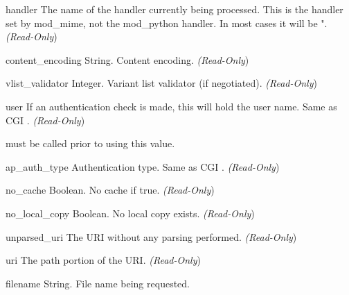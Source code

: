 \begin{memberdesc}[request]{handler}
  The name of the handler currently being processed. This is the handler
  set by mod_mime, not the mod_python handler. In most cases it will be
  ". \emph{(Read-Only})
\end{memberdesc}

\begin{memberdesc}[request]{content_encoding}
  String. Content encoding.
  \emph{(Read-Only})
\end{memberdesc}

\begin{memberdesc}[request]{vlist_validator}
  Integer. Variant list validator (if negotiated).
  \emph{(Read-Only})
\end{memberdesc}

\begin{memberdesc}[request]{user}
  If an authentication check is made, this will hold the user
  name. Same as CGI .
  \emph{(Read-Only})
  \begin{notice}
     must be called prior to using this value.
  \end{notice}
\end{memberdesc}

\begin{memberdesc}[request]{ap_auth_type}
  Authentication type. Same as CGI .
  \emph{(Read-Only})
\end{memberdesc}

\begin{memberdesc}[request]{no_cache}
  Boolean. No cache if true.
  \emph{(Read-Only})
\end{memberdesc}

\begin{memberdesc}[request]{no_local_copy}
  Boolean. No local copy exists.
  \emph{(Read-Only})
\end{memberdesc}

\begin{memberdesc}[request]{unparsed_uri}
  The URI without any parsing performed.
  \emph{(Read-Only})
\end{memberdesc}

\begin{memberdesc}[request]{uri}
  The path portion of the URI.
  \emph{(Read-Only})
\end{memberdesc}

\begin{memberdesc}[request]{filename}
  String. File name being requested.
\end{memberdesc}

